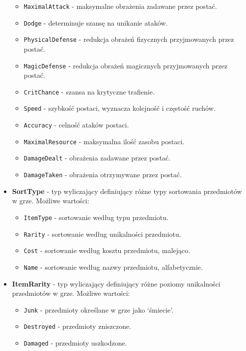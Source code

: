 \begin{itemize}
\begin{itemize}
                \item \texttt{MaximalAttack} - maksymalne obrażenia zadawane przez postać.
                \item \texttt{Dodge} - determinuje szansę na unikanie ataków.
                \item \texttt{PhysicalDefense} - redukcja obrażeń fizycznych przyjmowanych przez postać.
                \item \texttt{MagicDefense} - redukcja obrażeń magicznych przyjmowanych przez postać.
                \item \texttt{CritChance} - szansa na krytyczne trafienie.
                \item \texttt{Speed} - szybkość postaci, wyznacza kolejność i częstość ruchów.
                \item \texttt{Accuracy} - celność ataków postaci.
                \item \texttt{MaximalResource} - maksymalna ilość zasobu postaci.
                \item \texttt{DamageDealt} - obrażenia zadawane przez postać.
                \item \texttt{DamageTaken} - obrażenia otrzymywane przez postać.
            \end{itemize}
        \item \textbf{SortType} - typ wyliczający definiujący różne typy sortowania przedmiotów w grze. 
        Możliwe wartości:
            \begin{itemize}
                \item \texttt{ItemType} - sortowanie według typu przedmiotu.
                \item \texttt{Rarity} - sortowanie według unikalności przedmiotu.
                \item \texttt{Cost} - sortowanie według kosztu przedmiotu, malejąco.
                \item \texttt{Name} - sortowanie według nazwy przedmiotu, alfabetycznie.
            \end{itemize}
        \item \textbf{ItemRarity} - typ wyliczający definiujący różne poziomy unikalności przedmiotów w grze. 
        Możliwe wartości:
            \begin{itemize}
                \item \texttt{Junk} - przedmioty określane w grze jako `śmiecie'.
                \item \texttt{Destroyed} - przedmioty zniszczone.
                \item \texttt{Damaged} - przedmioty uszkodzone.

\end{itemize}
\end{itemize}

